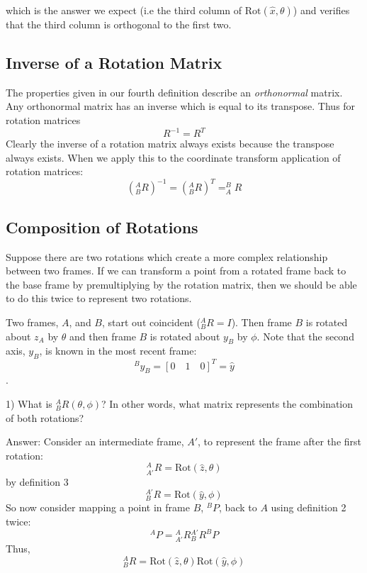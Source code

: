 which is the answer we expect (i.e the third column of $\mathrm{Rot}(\hat{x},\theta)$) and  verifies that the third column is orthogonal to the first two.

\subsection{Inverse of a Rotation Matrix}

The properties given in our fourth definition describe an {\it orthonormal } matrix.   Any orthonormal matrix has an inverse which is equal to its transpose.  Thus for rotation matrices
\[
R^{-1} = R^T
\]
Clearly the inverse of a rotation matrix always exists because the transpose always exists.  When we apply this to  the coordinate transform application of rotation matrices:
\[
(^A_BR)^{-1} = (^A_BR)^T = ^B_AR
\]


\subsection{Composition of Rotations}\label{rotationorder}
Suppose there are two rotations which create a more complex relationship between two frames.  If we can transform a point from a rotated frame back to the base frame by premultiplying by the rotation matrix, then we should be able to do this twice to represent two rotations.




\begin{ExampleSmall}\label{RotExampLocalFrame}

Two frames, $A$, and $B$, start out coincident ($^A_BR = I$).  Then frame $B$ is rotated about $z_A$ by $\theta$ and then frame $B$ is rotated about $y_B$ by $\phi$.  Note that the second axis, $y_B$, is known in the most recent frame:
\[
^By_B = [0 \quad 1\quad 0]^T = \hat{y}
\]
.

1) What is $^A_BR(\theta,\phi)$?  In other words, what matrix represents the combination of both rotations?

Answer: Consider an intermediate frame, $A'$, to represent the frame after the first rotation:
\[
^A_{A'}R = \mathrm{Rot}(\hat{z}, \theta)
\]
by definition 3
\[
^{A'}_BR = \mathrm{Rot}(\hat{y},\phi)
\]
So now consider mapping a point in frame $B$, $^BP$, back to $A$ using definition 2 twice:
\[
^AP = {^A_{A'}}R {^{A'}_B}R ^BP
\]
Thus,
\[
^A_BR = \mathrm{Rot}(\hat{z},\theta)\mathrm{Rot}(\hat{y},\phi)
\]
\end{ExampleSmall}



